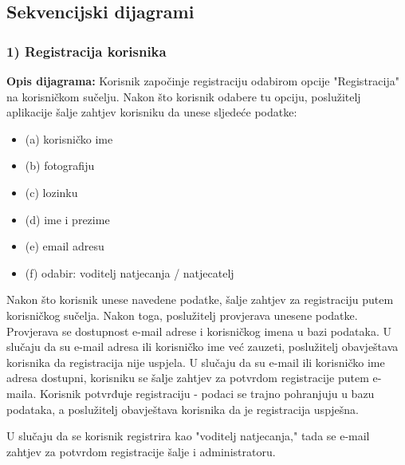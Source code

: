 				\eject		
				
			\subsection{Sekvencijski dijagrami}
										
														
				\subsubsection{1) Registracija korisnika}
				
				\textbf{Opis dijagrama:}
				Korisnik započinje registraciju odabirom opcije "Registracija" na korisničkom sučelju. Nakon što korisnik odabere tu opciju, poslužitelj aplikacije šalje zahtjev korisniku da unese sljedeće podatke:
				
				\begin{itemize}
					\item (a) korisničko ime
					\item (b) fotografiju
					\item (c) lozinku
					\item (d) ime i prezime
					\item (e) email adresu
					\item (f) odabir: voditelj natjecanja / natjecatelj
				\end{itemize}
				
				Nakon što korisnik unese navedene podatke, šalje zahtjev za registraciju putem korisničkog sučelja. Nakon toga, poslužitelj provjerava unesene podatke. Provjerava  se dostupnost e-mail adrese i korisničkog imena u bazi podataka. U slučaju da su e-mail adresa ili korisničko ime već zauzeti, poslužitelj obavještava korisnika da registracija nije uspjela.
				U slučaju da su e-mail ili korisničko ime adresa dostupni, korisniku se šalje zahtjev za potvrdom registracije putem e-maila. Korisnik potvrđuje registraciju - podaci se trajno pohranjuju u bazu podataka, a poslužitelj obavještava korisnika da je registracija uspješna.
				
				U slučaju da se korisnik registrira kao "voditelj natjecanja," tada se e-mail zahtjev za potvrdom registracije šalje i administratoru. 
				
